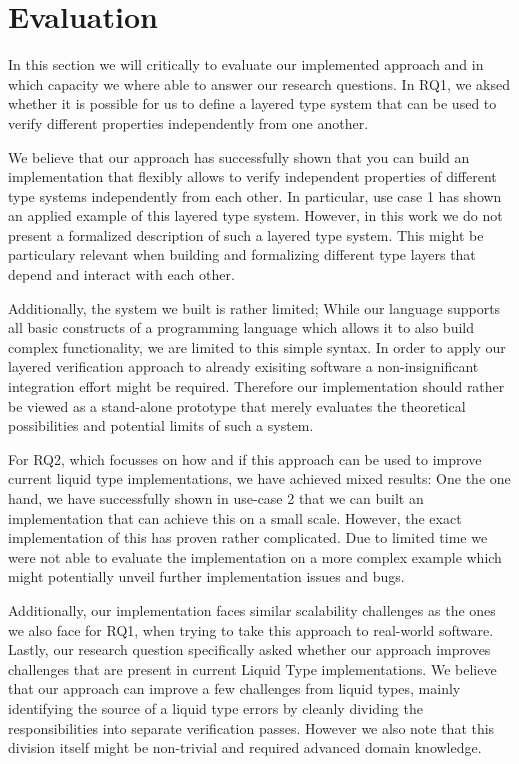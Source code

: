\section{Evaluation}
\label{sec:evaluation}

In this section we will critically to evaluate our implemented approach and in which capacity we where able to answer our research questions. In RQ1, we aksed whether it is possible for us to define a layered type system that can be used to verify different properties independently from one another.

We believe that our approach has successfully shown that you can build an implementation that flexibly allows to verify independent properties of different type systems independently from each other. In particular, use case 1 has shown an applied example of this layered type system. However, in this work we do not present a formalized description of such a layered type system. This might be particulary relevant when building and formalizing different type layers that depend and interact with each other.

Additionally, the system we built is rather limited; While our language supports all basic constructs of a programming language which allows it to also build complex functionality, we are limited to this simple syntax. In order to apply our layered verification approach to already exisiting software a non-insignificant integration effort might be required. Therefore our implementation should rather be viewed as a stand-alone prototype that merely evaluates the theoretical possibilities and potential limits of such a system.

For RQ2, which focusses on how and if this approach can be used to improve current liquid type implementations, we have achieved mixed results: One the one hand, we have successfully shown in use-case 2 that we can built an implementation that can achieve this on a small scale. However, the exact implementation of this has proven rather complicated. Due to limited time we were not able to evaluate the implementation on a more complex example which might potentially unveil further implementation issues and bugs.

Additionally, our implementation faces similar scalability challenges as the ones we also face for RQ1, when trying to take this approach to real-world software. Lastly, our research question specifically asked whether our approach improves challenges that are present in current Liquid Type implementations. We believe that our approach can improve a few challenges from liquid types, mainly identifying the source of a liquid type errors by cleanly dividing the responsibilities into separate verification passes. However we also note that this division itself might be non-trivial and required advanced domain knowledge.

